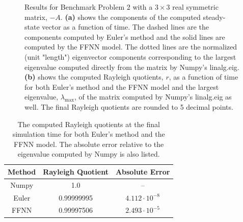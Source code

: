 \begin{figure}[H]
\centering
{}
\qquad
{}
\caption{Results for Benchmark Problem 2 with a $3\times 3$ real symmetric matrix, $-A$. \textbf{(a)} shows the components of the computed steady-state vector as a function of time. The dashed lines are the components computed by Euler's method and the solid lines are computed by the FFNN model. The dotted lines are the normalized (unit "length") eigenvector components corresponding to the largest eigenvalue computed directly from the matrix by Numpy's linalg.eig. \textbf{(b)} shows the computed Rayleigh quotients, $r$, as a function of time for both Euler's method and the FFNN model and the largest eigenvalue, $\lambda_\mathrm{max}$, of the matrix computed by Numpy's linalg.eig as well. The final Rayleigh quotients are rounded to 5 decimal points.}
\label{fig:benchrun2}
\end{figure}

\begin{table}[H]
\caption{The computed Rayleigh quotients at the final simulation time for both Euler's method and the FFNN model. The absolute error relative to the eigenvalue computed by Numpy is also listed.}
\centering
{}
\begin{tabular}{c|c|c}
\hline
\hline 
Method & Rayleigh Quotient & Absolute Error
\\
\hline 
\hline 
Numpy & 1.0 & –
\\
Euler & 0.99999995 & $4.112 \cdot 10^{-8}$  
\\
FFNN & 0.99997506 & $2.493 \cdot 10^{-5}$
\\
\hline
\hline 
\end{tabular}
\label{tab:eigbench2}
\end{table}


